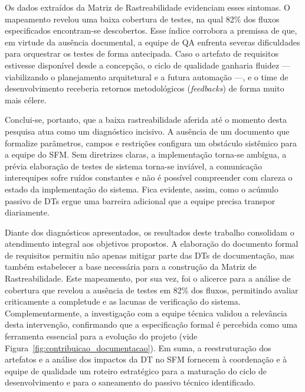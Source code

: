 Os dados extraídos da Matriz de Rastreabilidade evidenciam esses sintomas. O mapeamento revelou uma baixa cobertura de testes, na qual 82\% dos fluxos especificados encontram-se descobertos. Esse índice corrobora a premissa de que, em virtude da ausência documental, a equipe de QA enfrenta severas dificuldades para orquestrar os testes de forma antecipada. Caso o artefato de requisitos estivesse disponível desde a concepção, o ciclo de qualidade ganharia fluidez — viabilizando o planejamento arquitetural e a futura automação —, e o time de desenvolvimento receberia retornos metodológicos (\textit{feedbacks}) de forma muito mais célere.

Conclui-se, portanto, que a baixa rastreabilidade aferida até o momento desta pesquisa atua como um diagnóstico incisivo. A ausência de um documento que formalize parâmetros, campos e restrições configura um obstáculo sistêmico para a equipe do SFM. Sem diretrizes claras, a implementação torna-se ambígua, a prévia elaboração de testes de sistema torna-se inviável, a comunicação interequipes sofre ruídos constantes e não é possível compreender com clareza o estado da implementação do sistema. Fica evidente, assim, como o acúmulo passivo de DTs ergue uma barreira adicional que a equipe precisa transpor diariamente.

Diante dos diagnósticos apresentados, os resultados deste trabalho consolidam o atendimento integral aos objetivos propostos. A elaboração do documento formal de requisitos permitiu não apenas mitigar parte das DTs de documentação, mas também estabelecer a base necessária para a construção da Matriz de Rastreabilidade. Este mapeamento, por sua vez, foi o alicerce para a análise de cobertura que revelou a ausência de testes em 82\% dos fluxos, permitindo avaliar criticamente a completude e as lacunas de verificação do sistema. Complementarmente, a investigação com a equipe técnica validou a relevância desta intervenção, confirmando que a especificação formal é percebida como uma ferramenta essencial para a evolução do projeto (vide Figura~\ref{fig:contribuicao_documentacao}). Em suma, a reestruturação dos artefatos e a análise dos impactos da DT no SFM fornecem à coordenação e à equipe de qualidade um roteiro estratégico para a maturação do ciclo de desenvolvimento e para o saneamento do passivo técnico identificado.